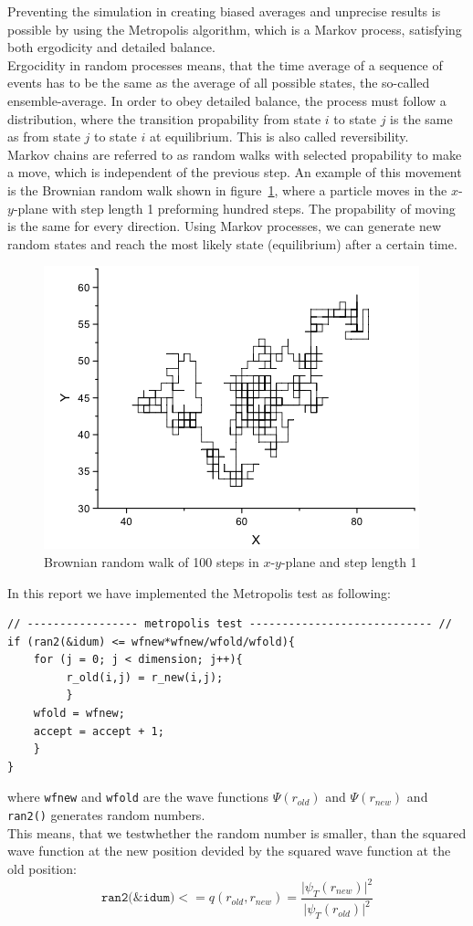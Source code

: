 \FloatBarrier
Preventing the simulation in creating biased averages and unprecise results is possible by using the Metropolis algorithm, which is a Markov process, satisfying both ergodicity and detailed balance.\\
Ergocidity in random processes means, that the time average of a sequence of events has to be the same as the average of all possible states, the so-called ensemble-average. In order to obey detailed balance, the process must follow a distribution, where the transition propability from state $i$ to state $j$ is the same as from state $j$ to state $i$ at equilibrium. This is also called reversibility.\\
Markov chains are referred to as random walks with selected propability to make a move, which is independent of the previous step. An example of this movement is the Brownian random walk shown in figure~\ref{fig:Brown}, where a particle moves in the $x$-$y$-plane with step length 1 preforming hundred steps. The propability of moving is the same for every direction. Using Markov processes, we can generate new random states and reach the most likely state (equilibrium) after a certain time.
\begin{figure}
    \centering
    \includegraphics[scale=0.45]{Brown}
    \caption{Brownian random walk of 100 steps in $x$-$y$-plane and step length 1}
    \label{fig:Brown}
\end{figure}
\FloatBarrier
In this report we have implemented the Metropolis test as following:
\begin{lstlisting}
// ----------------- metropolis test ---------------------------- //
if (ran2(&idum) <= wfnew*wfnew/wfold/wfold){
    for (j = 0; j < dimension; j++){
         r_old(i,j) = r_new(i,j);
         }
    wfold = wfnew;
    accept = accept + 1;
    }
}
\end{lstlisting}
where \texttt{wfnew} and \texttt{wfold} are the wave functions $\Psi(r_{old})$ and $\Psi(r_{new})$ and \texttt{ran2()} generates random numbers.\\
This means, that we testwhether the random number is smaller, than the squared wave function at the new position devided by the squared wave function at the old position:
\begin{equation}
\texttt{ran2(\&idum)} <= q(r_{old},r_{new}) = \frac{\vert \psi_T(r_{new})\vert^2}{\vert \psi_T(r_{old})\vert ^2}
\end{equation}
